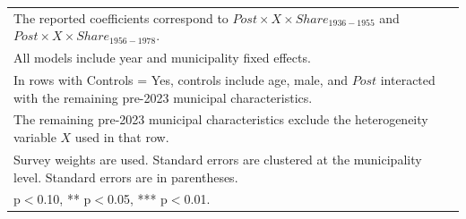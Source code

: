 \begin{table}[!htbp]
\begin{tabular}{llccr}
\multicolumn{5}{l}{\footnotesize The reported coefficients correspond to $Post \times X \times Share_{1936-1955}$ and $Post \times X \times Share_{1956-1978}$.} \\
\multicolumn{5}{l}{\footnotesize All models include year and municipality fixed effects.} \\
\multicolumn{5}{l}{\footnotesize In rows with Controls = Yes, controls include age, male, and $Post$ interacted with the remaining pre-2023 municipal characteristics.} \\
\multicolumn{5}{l}{\footnotesize The remaining pre-2023 municipal characteristics exclude the heterogeneity variable $X$ used in that row.} \\
\multicolumn{5}{l}{\footnotesize Survey weights are used. Standard errors are clustered at the municipality level. Standard errors are in parentheses.} \\
\multicolumn{5}{l}{\footnotesize * p$<$0.10, ** p$<$0.05, *** p$<$0.01.} \\
\end{tabular}
\end{table}

